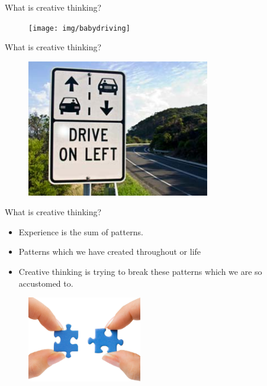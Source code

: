 \documentclass[notes]{beamer}
\begin{document}
\begin{frame}{What is \textcolor{HoGentAccent6}{creative} thinking?}
	\begin{figure}
		\texttt{[image: img/babydriving]}
	\end{figure}
\end{frame}

\begin{frame}{What is \textcolor{HoGentAccent6}{creative} thinking?}
	\begin{figure}
		\includegraphics[width=8cm]{img/drive.jpg}
	\end{figure}
\end{frame}

\begin{frame}{What is \textcolor{HoGentAccent6}{creative} thinking?}
	\begin{itemize}
		\item Experience is the sum of patterns.
		\item Patterns which we have created throughout or life
		\item \textcolor{HoGentAccent1}{Creative thinking} is trying to break these patterns which we are so accustomed to. 
	\end{itemize}

\begin{center}
	\begin{figure}
		\includegraphics[width=5cm]{img/puzzel.jpg}
	\end{figure}
\end{center}
\end{frame}
\end{document}
